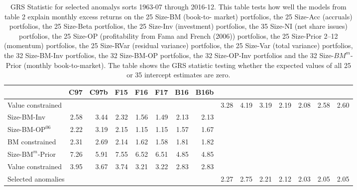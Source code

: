 
\begin{table}[!ht]
\centering
\caption{
\scriptsize{
GRS Statistic for selected anomalys sorts 1963-07 through 2016-12. This table tests how
well the models from table 2 explain monthly excess returns on the 25 Size-BM (book-to-
market) portfolios, the 25 Size-Acc (accruals) portfolios, the 25 Size-Beta portfolios,
the 25 Size-Inv (investment) portfolios, the 35 Size-NI (net share issues) portfolios, the
25 Size-OP (profitability from Fama and French (2006)) portfolios, the 25 Size-Prior 2–12
(momentum) portfolios, the 25 Size-RVar (residual variance) portfolios, the 25 Size-Var
(total variance) portfolios, the 32 Size-BM-Inv portfolios, the 32 Size-BM-OP portfolios,
the 32 Size-OP-Inv portfolios and the 32 Size-$BM^m$-Prior (monthly book-to-market). The
table shows the GRS statistic testing whether the expected values of all 25 or 35
intercept estimates are zero.
}
}
\begin{tabular}{lrrrrrrr}
  \toprule
     & C97  & C97b  & F15  & F16  & F17  & B16  & B16b  \\
  \midrule
  
    \multicolumn{8}{l}{Value constrained}
    
    Size-BM  & 3.28  & 4.19  & 3.19  & 2.19  & 2.08  & 2.58  & 2.60  \\
    
  
    
    
    Size-BM-Inv  & 2.58  & 3.44  & 2.32  & 1.56  & 1.49  & 2.13  & 2.13  \\
    
  
    
    
    Size-BM-$\text{OP}^{06}$  & 2.22  & 3.19  & 2.15  & 1.15  & 1.15  & 1.57  & 1.67  \\
    
  
    
    
    BM constrained  & 2.31  & 2.69  & 2.14  & 1.62  & 1.58  & 1.81  & 1.82  \\
    [1em]
  
    
    
    Size-$\text{BM}^m$-Prior  & 7.26  & 5.91  & 7.55  & 6.52  & 6.51  & 4.85  & 4.85  \\
    
  
    
    
    Value constrained  & 3.95  & 3.67  & 3.74  & 3.21  & 3.22  & 2.83  & 2.83  \\
    [1em]
  
    
    \multicolumn{8}{l}{Selected anomalies}
    Size-$\text{OP}^{06}$  & 2.27  & 2.75  & 2.21  & 2.12  & 2.03  & 2.05  & 2.05  \\
    

\end{tabular}
\end{table}
